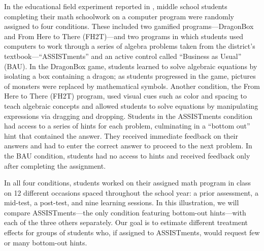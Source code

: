 \documentclass[]{article}
\begin{document}
In the educational field experiment reported in \citet{impactPaper}, middle school students completing their math schoolwork on a computer program were randomly assigned to four conditions.
These included two gamified programs---DragonBox and From Here to There (FH2T)---and two programs in which students used computers to work through a series of algebra problems taken from the district's textbook---``ASSISTments'' and an active control called ``Business as Usual'' (BAU).  %
In the DragonBox game, students learned to solve algebraic equations by isolating a box containing a dragon; as students progressed in the game, pictures of monsters were replaced by mathematical symbols.
Another condition, the From Here to There (FH2T) program, used visual cues such as color and spacing to teach algebraic concepts and allowed students to solve equations by manipulating expressions via dragging and dropping.
Students in the ASSISTments condition had access to a series of hints for each problem, culminating in a ``bottom out'' hint that contained the answer. They received immediate feedback on their answers and had to enter the correct answer to proceed to the next problem.
In the BAU condition, students had no access to hints and received feedback only after completing the assignment.

In all four conditions, students worked on their assigned math program in class on 12 different occasions spaced throughout the school year: a prior assessment, a mid-test, a post-test, and nine learning sessions.
In this illustration, we will compare ASSISTments---the only condition featuring bottom-out hints---with each of the three others separately. Our goal is to estimate different treatment effects for groups of students who, if assigned to ASSISTments, would request few or many bottom-out hints.
\end{document}
